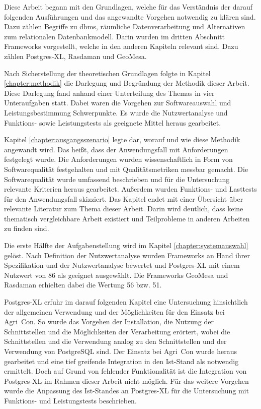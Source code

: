 Diese Arbeit begann mit den Grundlagen, welche für das Verständnis der darauf folgenden Ausführungen und das angewandte Vorgehen notwendig zu klären sind.
Dazu zählen Begriffe zu \Gls{dbms}, räumliche Datenverarbeitung und Alternativen zum relationalen Datenbankmodell.
Darin wurden im dritten Abschnitt Frameworks vorgestellt, welche in den anderen Kapiteln relevant sind.
Dazu zählen Postgres-XL, Rasdaman und GeoMesa.

Nach Sicherstellung der theoretischen Grundlagen folgte in Kapitel \ref{chapter:methodik} die Darlegung und Begründung der Methodik dieser Arbeit.
Diese Darlegung fand anhand einer Unterteilung des Themas in vier Unteraufgaben statt.
Dabei waren die Vorgehen zur Softwareauswahl und Leistungsbestimmung Schwerpunkte.
Es wurde die Nutzwertanalyse und Funktions- sowie Leistungstests als geeignete Mittel heraus gearbeitet.

Kapitel \ref{chapter:ausgangsszenario} legte dar, worauf und wie diese Methodik angewandt wird.
Das heißt, dass der Anwendungsfall mit Anforderungen festgelegt wurde.
Die Anforderungen wurden wissenschaftlich in Form von Softwarequalität festgehalten und mit Qualitätsmetriken messbar gemacht.
Die Softwarequalität wurde umfassend beschrieben und für die Untersuchung relevante Kriterien heraus gearbeitet.
Außerdem wurden Funktions- und Lasttests für den Anwendungsfall skizziert.
Das Kapitel endet mit einer Übersicht über relevante Literatur zum Thema dieser Arbeit.
Darin wird deutlich, dass keine thematisch vergleichbare Arbeit existiert und Teilprobleme in anderen Arbeiten zu finden sind.

Die erste Hälfte der Aufgabenstellung wird im Kapitel \ref{chapter:systemauswahl} gelöst.
Nach Definition der Nutzwertanalyse wurden Frameworks an Hand ihrer Spezifikation und der Nutzwertanalyse bewertet und Postgres-XL mit einem Nutzwert von 86 als geeignet ausgewählt.
Die Frameworks GeoMesa und Rasdaman erhielten dabei die Wertung 56 bzw. 51.

Postgres-XL erfuhr im darauf folgenden Kapitel eine Untersuchung hinsichtlich der allgemeinen Verwendung und der Möglichkeiten für den Einsatz bei Agri~Con.
So wurde das Vorgehen der Installation, die Nutzung der Schnittstellen und die Möglichkeiten der Verarbeitung erörtert, wobei die Schnittstellen und die Verwendung analog zu den Schnittstellen und der Verwendung von PostgreSQL sind.
Der Einsatz bei Agri~Con wurde heraus gearbeitet und eine tief greifende Integration in den Ist-Stand als notwendig ermittelt.
Doch auf Grund von fehlender Funktionalität ist die Integration von Postgres-XL im Rahmen dieser Arbeit nicht möglich.
Für das weitere Vorgehen wurde die Anpassung des Ist-Standes an Postgres-XL für die Untersuchung mit Funktions- und Leistungstests beschrieben.

